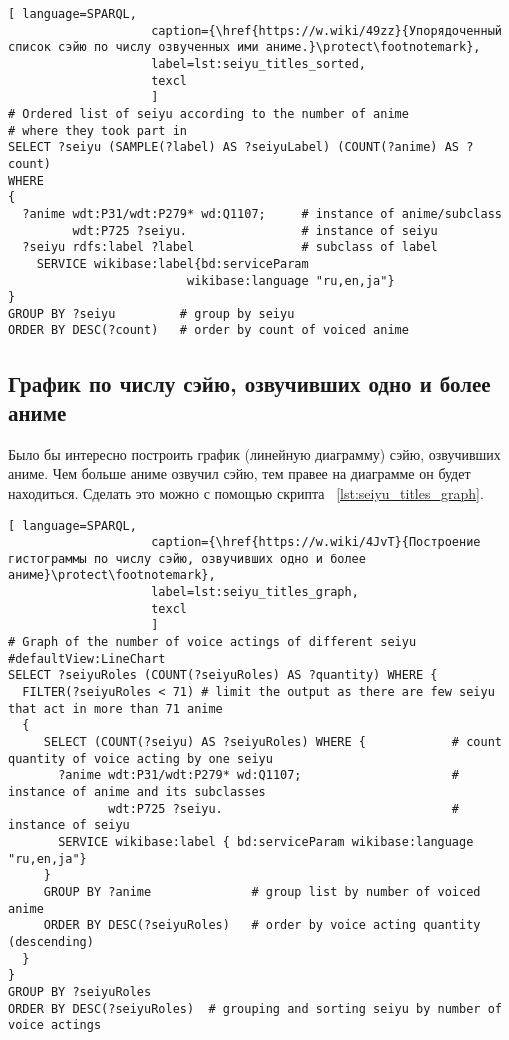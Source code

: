 \begin{lstlisting}[ language=SPARQL, 
                    caption={\href{https://w.wiki/49zz}{Упорядоченный список сэйю по числу озвученных ими аниме.}\protect\footnotemark},
                    label=lst:seiyu_titles_sorted,
                    texcl 
                    ]
# Ordered list of seiyu according to the number of anime
# where they took part in
SELECT ?seiyu (SAMPLE(?label) AS ?seiyuLabel) (COUNT(?anime) AS ?count)
WHERE
{
  ?anime wdt:P31/wdt:P279* wd:Q1107;	 # instance of anime/subclass
         wdt:P725 ?seiyu. 	             # instance of seiyu
  ?seiyu rdfs:label ?label	             # subclass of label
    SERVICE wikibase:label{bd:serviceParam
					     wikibase:language "ru,en,ja"}
}
GROUP BY ?seiyu		    # group by seiyu 
ORDER BY DESC(?count)	# order by count of voiced anime
\end{lstlisting}%

\subsection{График по числу сэйю, озвучивших одно и более аниме}

Было бы интересно построить график (линейную диаграмму) сэйю, озвучивших аниме. Чем больше аниме озвучил сэйю, тем правее на диаграмме он будет находиться. Сделать это можно с помощью скрипта ~\protect\ref{lst:seiyu_titles_graph}.

\begin{fullwidth}
\lstset{numbers=left, firstnumber=1, frame=single}
\begin{lstlisting}[ language=SPARQL, 
                    caption={\href{https://w.wiki/4JvT}{Построение гистограммы по числу сэйю, озвучивших одно и более аниме}\protect\footnotemark},
                    label=lst:seiyu_titles_graph,
                    texcl 
                    ]
# Graph of the number of voice actings of different seiyu
#defaultView:LineChart
SELECT ?seiyuRoles (COUNT(?seiyuRoles) AS ?quantity) WHERE {
  FILTER(?seiyuRoles < 71) # limit the output as there are few seiyu that act in more than 71 anime
  {
     SELECT (COUNT(?seiyu) AS ?seiyuRoles) WHERE {            # count quantity of voice acting by one seiyu
       ?anime wdt:P31/wdt:P279* wd:Q1107;                     # instance of anime and its subclasses
              wdt:P725 ?seiyu.                                # instance of seiyu
       SERVICE wikibase:label { bd:serviceParam wikibase:language "ru,en,ja"}
     }
     GROUP BY ?anime              # group list by number of voiced anime
     ORDER BY DESC(?seiyuRoles)   # order by voice acting quantity (descending)
  }
}
GROUP BY ?seiyuRoles
ORDER BY DESC(?seiyuRoles)  # grouping and sorting seiyu by number of voice actings
\end{lstlisting}%
\lstset{numbers=none}
\end{fullwidth}

